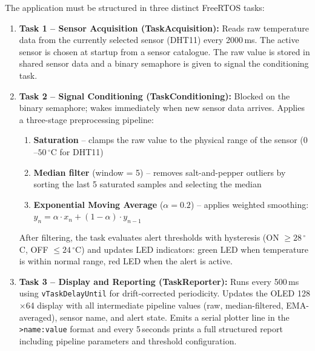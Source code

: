The application must be structured in three distinct FreeRTOS tasks:

\begin{enumerate}
  \item \textbf{Task 1 -- Sensor Acquisition (TaskAcquisition):} Reads raw temperature
    data from the currently selected sensor (DHT11) every 2000\,ms. The active sensor
    is chosen at startup from a sensor catalogue. The raw value is stored in shared
    sensor data and a binary semaphore is given to signal the conditioning task.

  \item \textbf{Task 2 -- Signal Conditioning (TaskConditioning):} Blocked on the binary
    semaphore; wakes immediately when new sensor data arrives. Applies a three-stage
    preprocessing pipeline:
    \begin{enumerate}
      \item \textbf{Saturation} -- clamps the raw value to the physical range of the
        sensor ($0$--$50\,^\circ$C for DHT11)
      \item \textbf{Median filter} (window = 5) -- removes salt-and-pepper outliers by
        sorting the last 5 saturated samples and selecting the median
      \item \textbf{Exponential Moving Average} ($\alpha = 0.2$) -- applies weighted
        smoothing: $y_n = \alpha \cdot x_n + (1 - \alpha) \cdot y_{n-1}$
    \end{enumerate}
    After filtering, the task evaluates alert thresholds with hysteresis
    (ON $\geq 28\,^\circ$C, OFF $\leq 24\,^\circ$C) and updates LED indicators:
    green LED when temperature is within normal range, red LED when the alert is active.

  \item \textbf{Task 3 -- Display and Reporting (TaskReporter):} Runs every 500\,ms
    using \texttt{vTaskDelayUntil} for drift-corrected periodicity. Updates the OLED
    128$\times$64 display with all intermediate pipeline values (raw, median-filtered,
    EMA-averaged), sensor name, and alert state. Emits a serial plotter line in the
    \texttt{>name:value} format and every 5\,seconds prints a full structured report
    including pipeline parameters and threshold configuration.
\end{enumerate}
